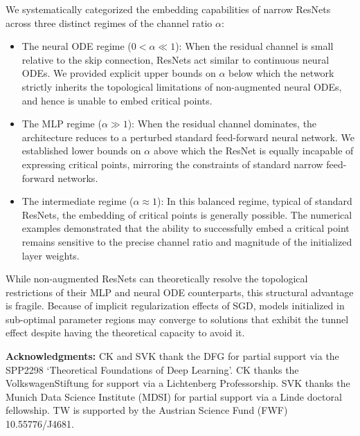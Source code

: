 \documentclass[10pt]{article}
\theoremstyle{definition}
\numberwithin{equation}{section}
\begin{document}
We systematically categorized the embedding capabilities of narrow ResNets across three distinct regimes of the channel ratio $\alpha$: 
\begin{itemize}
    \item The neural ODE regime ($0 < \alpha \ll 1$): When the residual channel is small relative to the skip connection, ResNets act similar to continuous neural ODEs. We provided explicit upper bounds on $\alpha$ below which the network strictly inherits the topological limitations of non-augmented neural ODEs, and hence is unable to embed critical points.

\item The MLP regime ($\alpha \gg 1$): When the residual channel dominates, the architecture reduces to a perturbed standard feed-forward neural network. We established lower bounds on $\alpha$ above which the ResNet is equally incapable of expressing critical points, mirroring the constraints of standard narrow feed-forward networks.

\item The intermediate regime ($\alpha \approx 1$): In this balanced regime, typical of standard ResNets, the embedding of critical points is generally possible. The numerical examples demonstrated that the ability to successfully embed a critical point remains sensitive to the precise channel ratio and magnitude of the initialized layer weights.
\end{itemize} 

While non-augmented ResNets can theoretically resolve the topological restrictions of their MLP and neural ODE counterparts, this structural advantage is fragile. Because of implicit regularization effects of SGD, models initialized in sub-optimal parameter regions may converge to solutions that exhibit the tunnel effect despite having the theoretical capacity to avoid it.


\vspace{5mm}
	
	
\noindent\textbf{Acknowledgments:} CK and SVK thank the DFG for partial support via the SPP2298 `Theoretical Foundations of Deep Learning'. CK thanks the VolkswagenStiftung for support via a Lichtenberg Professorship. SVK thanks the Munich Data Science Institute (MDSI) for partial support via a Linde doctoral fellowship. TW is supported by the Austrian Science Fund (FWF) 10.55776/J4681.
	
\vspace{3mm}

    
	
	
\end{document}
